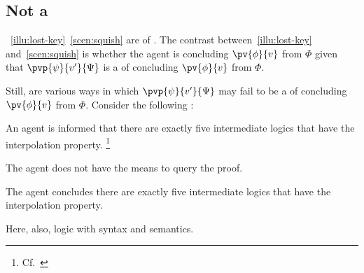 \subsection{Not a \requ{}}
\label{sec:not-requ}

\begin{note}
  ~\ref{illu:lost-key}~\ref{scen:squish} are  of .
  The contrast between~\ref{illu:lost-key} and~\ref{scen:squish} is whether the agent is concluding \(\pv{\phi}{v}\) from \(\Phi\) given that \(\pvp{\psi}{v'}{\Psi}\) is a \requ{} of concluding \(\pv{\phi}{v}\) from \(\Phi\).

  Still,  are various ways in which \(\pvp{\psi}{v'}{\Psi}\) may fail to be a  of concluding \(\pv{\phi}{v}\) from \(\Phi\).
  Consider the following :

  \begin{scenario}
    \label{illu:testimony-layperson}
    An agent is informed that there are exactly five intermediate logics that have the interpolation property.%
    \footnote{Cf.\ \textcite{Maksimova:1977un}}
  \end{scenario}

  

  The agent does not have the means to query the proof.

    The agent concludes there are exactly five intermediate logics that have the interpolation property.

  Here, also, logic with syntax and semantics.
\end{note}

